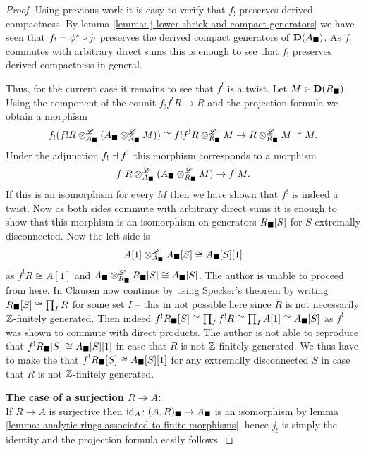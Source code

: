 \begin{proof}
	Using previous work it is easy to verify that $f_!$ preserves derived compactness. By lemma \ref{lemma: j lower shriek and compact generators} we have seen that $f_! ={\phi^\ast}\circ j_!$ preserves the derived compact generators of ${{\mathbf{D}}(A_\blacksquare)}$. As $f_!$ commutes with arbitrary direct sums this is enough to see that $f_!$ preserves derived compactness in general.

	Thus, for the current case it remains to see that $f^!$ is a twist. Let $M\in{{\mathbf{D}}(R_\blacksquare)}$. Using the component of the counit $f_!f^! R \to R$ and the projection formula we obtain a morphism
		$$f_!(f!R \otimes^{\mathscr{L}}_{A_\blacksquare} (A_\blacksquare\otimes^{\mathscr{L}}_{R_\blacksquare} M))\cong f!f^! R\otimes^{\mathscr{L}}_{R_\blacksquare} M \to R\otimes^{\mathscr{L}}_{R_\blacksquare} M \cong M.$$
	Under the adjunction $f_!\dashv f^!$ this morphism corresponds to a morphism
		$$f^!R\otimes^{\mathscr{L}}_{A_\blacksquare}(A_\blacksquare\otimes^{\mathscr{L}}_{R_\blacksquare} M) \to f^!M.$$
	If this is an isomorphism for every $M$ then we have shown that $f^!$ is indeed a twist. Now as both sides commute with arbitrary direct sums it is enough to show that this morphism is an isomorphism on generators ${R_\blacksquare[S]}$ for $S$ extremally disconnected. Now the left side is
		$$A[1]\otimes^{\mathscr{L}}_{A_\blacksquare} {A_\blacksquare[S]} \cong {A_\blacksquare[S]}[1]$$
	as $f^!R \cong A[1]$ and $A_\blacksquare\otimes^{\mathscr{L}}_{R_\blacksquare} {R_\blacksquare[S]}\cong {A_\blacksquare[S]}$. The author is unable to proceed from here. In \cite[p. 58]{condenseddotpdf} Clausen now continue by using Specker's theorem by writing ${R_\blacksquare[S]}\cong \prod_I R$ for some set $I$ -- this in not possible here since $R$ is not necessarily ${\mathbb{Z}}$-finitely generated. Then indeed $f^!{R_\blacksquare[S]} \cong \prod_I f^!R \cong \prod_I A[1] \cong {A_\blacksquare[S]}$ as $f^!$ was shown to commute with direct products. The author is not able to reproduce that $f^!{R_\blacksquare[S]} \cong {A_\blacksquare[S]}[1]$ in case that $R$ is not ${\mathbb{Z}}$-finitely generated. We thus have to make the \assumptionPreWord that $f^!{R_\blacksquare[S]} \cong {A_\blacksquare[S]}[1]$ for any extremally disconnected $S$ in case that $R$ is not ${\mathbb{Z}}$-finitely generated.
	
	\textbf{The case of a surjection $R\twoheadrightarrow A$:}\\
	If $R\to A$ is surjective then $\mathrm{id}_A\colon (A, R)_\blacksquare\to A_\blacksquare$ is an isomorphism by lemma \ref{lemma: analytic rings associated to finite morphisms}, hence $j_!$ is simply the identity and the projection formula easily follows.
	

\end{proof}
